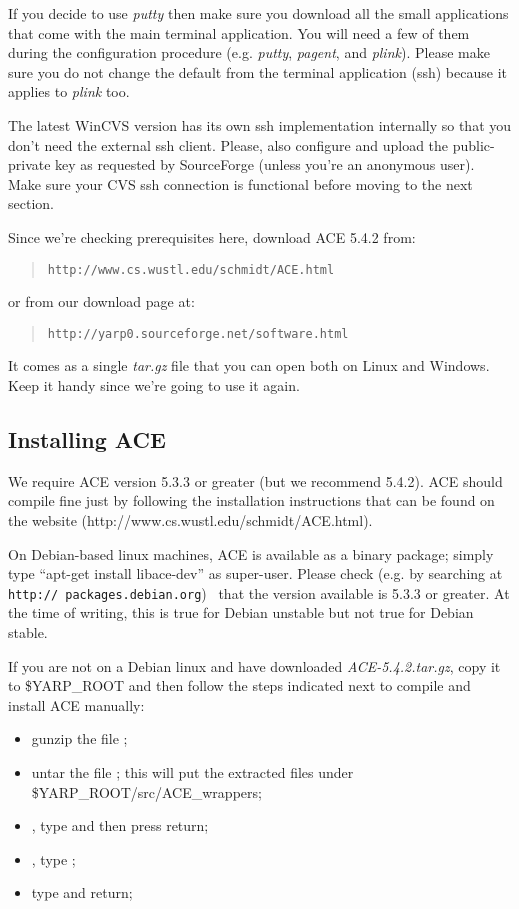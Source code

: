 If you decide to use {\em putty} then make sure you download all the small applications that come with the main terminal application. You will need a few of them during the configuration procedure (e.g. {\em putty}, {\em pagent}, and {\em plink}). Please make sure you do not change the default from the terminal application (ssh) because it applies to {\em plink} too.

The latest WinCVS version has its own ssh implementation internally so that you don't need the external ssh client. Please, also configure and upload the public-private key as requested by SourceForge (unless you're an anonymous user). Make sure your CVS ssh connection is functional before moving to the next section. 

Since we're checking prerequisites here, download ACE 5.4.2 from:

\begin{quote}
{\tt http://www.cs.wustl.edu/schmidt/ACE.html}
\end{quote}

or from our download page at:
\begin{quote}
{\tt http://yarp0.sourceforge.net/software.html}
\end{quote}

It comes as a single {\em tar.gz} file that you can open both on Linux and Windows. Keep it handy since we're going to use it again.

\subsection{Installing ACE}
We require ACE version 5.3.3 or greater (but we recommend 5.4.2). ACE should compile fine just by following the installation instructions that can be found on the website (http://www.cs.wustl.edu/schmidt/ACE.html). 

On Debian-based linux machines, ACE is available as a binary package; simply type ``apt-get install libace-dev'' as super-user.  Please check (e.g. by searching at {\tt http:// packages.debian.org}) ~that the version available is 5.3.3 or greater.  At the time of writing, this is true for Debian unstable but not true for Debian stable.

If you are not on a Debian linux and have downloaded {\em ACE-5.4.2.tar.gz}, copy it to \$YARP\_ROOT and then follow the steps indicated next to compile and install ACE manually:
\begin{itemize}
\item gunzip the file ;
\item untar the file ; this will put the extracted files under \$YARP\_ROOT/src/ACE\_wrappers;
\item {}, type  and then press return;
\item {}, type ;
\item type  and return;
\end{itemize}

